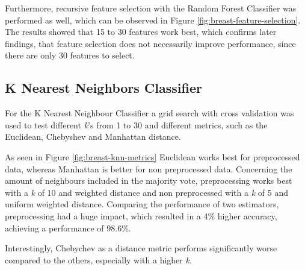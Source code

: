 


Furthermore, recursive feature selection with the Random Forest Classifier was performed as well, which can be observed in Figure \ref{fig:breast-feature-selection}. The results showed that 15 to 30 features work best, which confirms later findings, that feature selection does not necessarily improve performance, since there are only 30 features to select.


\subsection{K Nearest Neighbors Classifier}

For the K Nearest Neighbour Classifier a grid search with cross validation was used to test different \textit{k}'s from 1 to 30 and different metrics, such as the Euclidean, Chebyshev and Manhattan distance.

As seen in Figure \ref{fig:breast-knn-metrics} Euclidean works best for preprocessed data, whereas Manhattan is better for non preprocessed data.
Concerning the amount of neighbours included in the majority vote, preprocessing works best with a \textit{k} of 10 and weighted distance and non preprocessed with a \textit{k} of 5 and uniform weighted distance.
Comparing the performance of two estimators, preprocessing had a huge impact, which resulted in a 4\% higher accuracy, achieving a performance of 98.6\%.  

Interestingly, Chebychev as a distance metric performs significantly worse compared to the others, especially with a higher \textit{k}.

